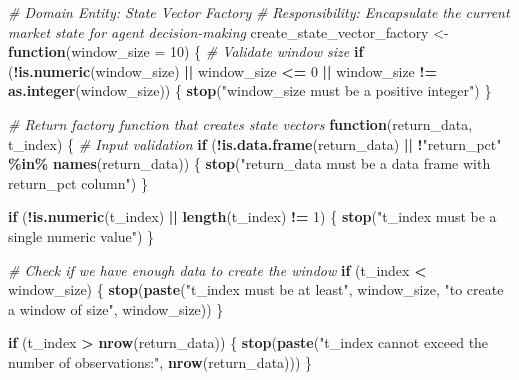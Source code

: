 \documentclass[
]{article}
\newenvironment{Shaded}{\begin{snugshade}}{\end{snugshade}}
\newcommand{\AttributeTok}[1]{\textcolor[rgb]{0.13,0.29,0.53}{#1}}
\newcommand{\CommentTok}[1]{\textcolor[rgb]{0.56,0.35,0.01}{\textit{#1}}}
\newcommand{\ControlFlowTok}[1]{\textcolor[rgb]{0.13,0.29,0.53}{\textbf{#1}}}
\newcommand{\DecValTok}[1]{\textcolor[rgb]{0.00,0.00,0.81}{#1}}
\newcommand{\FunctionTok}[1]{\textcolor[rgb]{0.13,0.29,0.53}{\textbf{#1}}}
\newcommand{\NormalTok}[1]{#1}
\newcommand{\OtherTok}[1]{\textcolor[rgb]{0.56,0.35,0.01}{#1}}
\newcommand{\SpecialCharTok}[1]{\textcolor[rgb]{0.81,0.36,0.00}{\textbf{#1}}}
\newcommand{\StringTok}[1]{\textcolor[rgb]{0.31,0.60,0.02}{#1}}
\begin{document}
\begin{Shaded}
\begin{Highlighting}[]
\CommentTok{\# Domain Entity: State Vector Factory}
\CommentTok{\# Responsibility: Encapsulate the current market state for agent decision{-}making}
\NormalTok{create\_state\_vector\_factory }\OtherTok{\textless{}{-}} \ControlFlowTok{function}\NormalTok{(}\AttributeTok{window\_size =} \DecValTok{10}\NormalTok{) \{}
  \CommentTok{\# Validate window size}
  \ControlFlowTok{if}\NormalTok{ (}\SpecialCharTok{!}\FunctionTok{is.numeric}\NormalTok{(window\_size) }\SpecialCharTok{||}\NormalTok{ window\_size }\SpecialCharTok{\textless{}=} \DecValTok{0} \SpecialCharTok{||}\NormalTok{ window\_size }\SpecialCharTok{!=} \FunctionTok{as.integer}\NormalTok{(window\_size)) \{}
    \FunctionTok{stop}\NormalTok{(}\StringTok{"window\_size must be a positive integer"}\NormalTok{)}
\NormalTok{  \}}
  
  \CommentTok{\# Return factory function that creates state vectors}
  \ControlFlowTok{function}\NormalTok{(return\_data, t\_index) \{}
    \CommentTok{\# Input validation}
    \ControlFlowTok{if}\NormalTok{ (}\SpecialCharTok{!}\FunctionTok{is.data.frame}\NormalTok{(return\_data) }\SpecialCharTok{||} \SpecialCharTok{!}\StringTok{"return\_pct"} \SpecialCharTok{\%in\%} \FunctionTok{names}\NormalTok{(return\_data)) \{}
      \FunctionTok{stop}\NormalTok{(}\StringTok{"return\_data must be a data frame with \textquotesingle{}return\_pct\textquotesingle{} column"}\NormalTok{)}
\NormalTok{    \}}
    
    \ControlFlowTok{if}\NormalTok{ (}\SpecialCharTok{!}\FunctionTok{is.numeric}\NormalTok{(t\_index) }\SpecialCharTok{||} \FunctionTok{length}\NormalTok{(t\_index) }\SpecialCharTok{!=} \DecValTok{1}\NormalTok{) \{}
      \FunctionTok{stop}\NormalTok{(}\StringTok{"t\_index must be a single numeric value"}\NormalTok{)}
\NormalTok{    \}}
    
    \CommentTok{\# Check if we have enough data to create the window}
    \ControlFlowTok{if}\NormalTok{ (t\_index }\SpecialCharTok{\textless{}}\NormalTok{ window\_size) \{}
      \FunctionTok{stop}\NormalTok{(}\FunctionTok{paste}\NormalTok{(}\StringTok{"t\_index must be at least"}\NormalTok{, window\_size, }
                 \StringTok{"to create a window of size"}\NormalTok{, window\_size))}
\NormalTok{    \}}
    
    \ControlFlowTok{if}\NormalTok{ (t\_index }\SpecialCharTok{\textgreater{}} \FunctionTok{nrow}\NormalTok{(return\_data)) \{}
      \FunctionTok{stop}\NormalTok{(}\FunctionTok{paste}\NormalTok{(}\StringTok{"t\_index cannot exceed the number of observations:"}\NormalTok{, }\FunctionTok{nrow}\NormalTok{(return\_data)))}
\NormalTok{    \}}
    

\end{Highlighting}
\end{Shaded}
\end{document}
